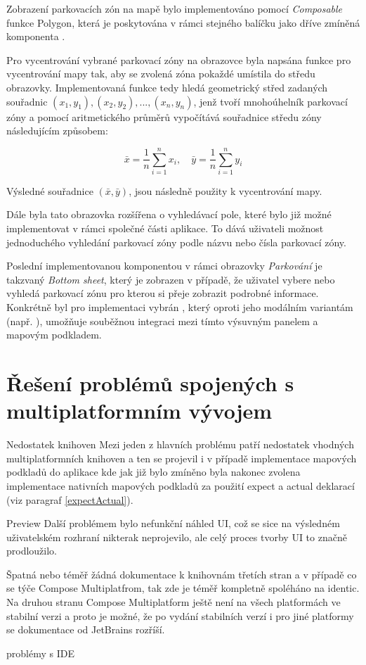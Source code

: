 Zobrazení parkovacích zón na mapě bylo implementováno pomocí \textit{Composable} funkce Polygon, která je poskytována v rámci stejného balíčku 
jako dříve zmíněná komponenta .

Pro vycentrování vybrané parkovací zóny na obrazovce byla napsána funkce pro vycentrování mapy tak, aby se zvolená zóna pokaždé 
umístila do středu obrazovky. Implementovaná funkce tedy hledá geometrický střed zadaných souřadnic \( (x_1, y_1), (x_2, y_2), ..., (x_n, y_n)\), 
jenž tvoří mnohoúhelník parkovací zóny a pomocí aritmetického průměrů vypočítává souřadnice středu zóny následujícím způsobem:

\[
\bar{x} = \frac{1}{n} \sum_{i=1}^{n} x_i, \quad \bar{y} = \frac{1}{n} \sum_{i=1}^{n} y_i
\]

Výsledné souřadnice $(\bar{x},\bar{y})$, jsou následně použity k vycentrování mapy.

\bigskip

Dále byla tato obrazovka rozšířena o vyhledávací pole, které bylo již možné implementovat v rámci společné části aplikace. 
To dává uživateli možnost jednoduchého vyhledání parkovací zóny podle názvu nebo čísla parkovací zóny.

Poslední implementovanou komponentou v rámci obrazovky \textit{Parkování} je takzvaný \textit{Bottom sheet}, který je zobrazen v případě, 
že uživatel vybere nebo vyhledá parkovací zónu pro kterou si přeje zobrazit podrobné informace. Konkrétně byl pro implementaci vybrán 
, který oproti jeho modálním variantám (např. ), umožňuje souběžnou integraci mezi tímto
 výsuvným panelem a mapovým podkladem.


\section{Řešení problémů spojených s multiplatformním vývojem} %
Nedostatek knihoven
Mezi jeden z hlavních problému patří nedostatek vhodných multiplatformních knihoven a ten se projevil i v případě implementace mapových podkladů
do aplikace kde jak již bylo zmíněno byla nakonec zvolena implementace nativních mapových podkladů za použití expect a actual deklarací (viz paragraf \ref{expectActual}).

Preview
Další problémem bylo nefunkční náhled UI, což se sice na výsledném uživatelském rozhraní nikterak neprojevilo, ale celý proces tvorby UI to značně 
prodloužilo.

Špatná nebo téměř žádná dokumentace k knihovnám třetích stran a v případě co se týče Compose Multiplatfrom, tak zde je téměř kompletně spoléháno na
identic. 
Na druhou stranu Compose Multiplatform ještě není na všech platformách ve stabilní verzi a proto je možné, že po vydání stabilních verzí i pro jiné
platformy se dokumentace od JetBrains rozříší.

problémy s IDE 


